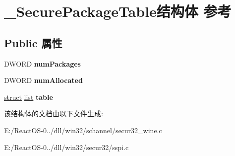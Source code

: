 \hypertarget{struct___secure_package_table}{}\section{\+\_\+\+Secure\+Package\+Table结构体 参考}
\label{struct___secure_package_table}
\subsection*{Public 属性}
\begin{DoxyCompactItemize}
\item 
\mbox{\label{struct___secure_package_table_a5261f79f03fa44712e850f68c3acc654}} 
D\+W\+O\+RD {\bfseries num\+Packages}
\item 
\mbox{\label{struct___secure_package_table_a4ebf6409749d16c3e8ecc3c7f801678f}} 
D\+W\+O\+RD {\bfseries num\+Allocated}
\item 
\mbox{\label{struct___secure_package_table_aa1a8d80510e3ac3e8f1323bdd02e258a}} 
\hyperlink{interfacestruct}{struct} \hyperlink{classlist}{list} {\bfseries table}
\end{DoxyCompactItemize}


该结构体的文档由以下文件生成\+:\begin{DoxyCompactItemize}
\item 
E\+:/\+React\+O\+S-\/0../dll/win32/schannel/secur32\+\_\+wine.\+c\item 
E\+:/\+React\+O\+S-\/0../dll/win32/secur32/sspi.\+c\end{DoxyCompactItemize}
